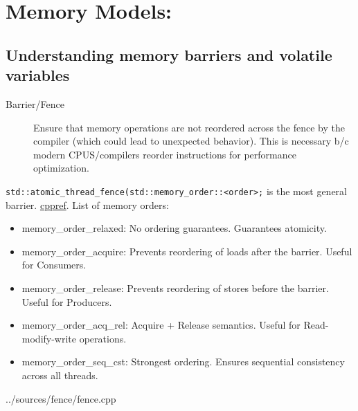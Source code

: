\documentclass{article}
\begin{document}
\section{Memory Models:}
\subsection{ Understanding memory barriers and volatile variables}
\begin{description}
	\item[Barrier/Fence]
	      Ensure that memory operations are not reordered across the fence by the compiler (which could lead to unexpected behavior). This is necessary b/c modern CPUS/compilers reorder instructions for performance optimization.
\end{description}
\verb!std::atomic_thread_fence(std::memory_order::<order>;! is the most general barrier. \href{https://en.cppreference.com/w/cpp/atomic/atomic_thread_fence}{cppref}.
List of memory orders:
\begin{itemize}
	\item memory\_order\_relaxed: No ordering guarantees. Guarantees atomicity.
	\item memory\_order\_acquire: Prevents reordering of loads after the barrier. Useful for Consumers.
	\item memory\_order\_release: Prevents reordering of stores before the barrier. Useful for Producers.
	\item memory\_order\_acq\_rel: Acquire + Release semantics. Useful for Read-modify-write operations.
	\item memory\_order\_seq\_cst: Strongest ordering. Ensures sequential consistency across all threads.
\end{itemize}
 {../sources/fence/fence.cpp}
\end{document}
